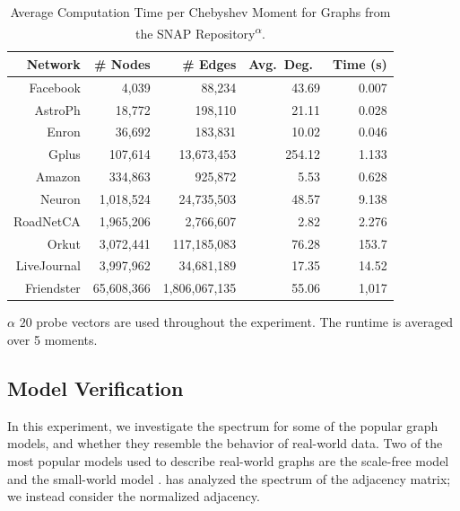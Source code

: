 \begin{table}[ht]
  \begin{center}
  \captionsetup{width=.8\textwidth}
  \caption{Average Computation Time per Chebyshev Moment for Graphs from the
  SNAP Repository\textsuperscript{$\alpha$}.}\label{tab:scaling}
  \begin{threeparttable}
    \begin{tabular}{r r r r r}
      \toprule
      Network & \# Nodes &\# Edges & Avg.\ Deg.\ & Time (s) \\ \midrule
      Facebook & 4,039 & 88,234 & 43.69 & 0.007\\
      AstroPh & 18,772 & 198,110 & 21.11 & 0.028\\
      Enron & 36,692 & 183,831 & 10.02 & 0.046\\
      Gplus & 107,614 & 13,673,453 & 254.12 & 1.133\\
      Amazon & 334,863 & 925,872 & 5.53 & 0.628\\
      Neuron & 1,018,524 & 24,735,503 & 48.57 & 9.138\\
      RoadNetCA & 1,965,206 & 2,766,607 & 2.82 & 2.276\\
      Orkut & 3,072,441 & 117,185,083 & 76.28 & 153.7\\
      LiveJournal & 3,997,962 & 34,681,189 & 17.35 & 14.52 \\
      Friendster & 65,608,366 & 1,806,067,135 & 55.06 & 1,017\\
      \bottomrule
    \end{tabular}
    \begin{tablenotes}
      \item[$\alpha$]$20$ probe vectors are used throughout the experiment. The
      runtime is averaged over 5 moments.
    \end{tablenotes}
  \end{threeparttable}
  \end{center}
\end{table}

\subsection{Model Verification}

In this experiment, we investigate the spectrum for some of the popular graph
models, and whether they resemble the behavior of real-world data. Two of the
most popular models used to describe real-world graphs are the scale-free model 
\cite{barabasi1999emergence} and the small-world model 
\cite{watts1998collective}. \citet{farkas2001spectra} has analyzed
the spectrum of the adjacency matrix; we instead consider the normalized
adjacency.

